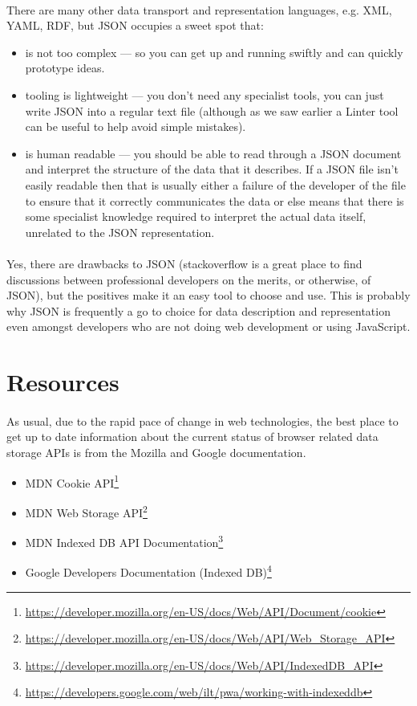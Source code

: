 \paragraph{} There are many other data transport and representation languages, e.g. XML, YAML, RDF, but JSON occupies a sweet spot that:

\begin{itemize}
\item is not too complex — so you can get up and running swiftly and can quickly prototype ideas.
\item tooling is lightweight — you don't need any specialist tools, you can just write JSON into a regular text file (although as we saw earlier a Linter tool can be useful to help avoid simple mistakes).
\item is human readable — you should be able to read through a JSON document and interpret the structure of the data that it describes. If a JSON file isn't easily readable then that is usually either a failure of the developer of the file to ensure that it correctly communicates the data or else means that there is some specialist knowledge required to interpret the actual data itself, unrelated to the JSON representation.
\end{itemize}

\paragraph{} Yes, there are drawbacks to JSON (stackoverflow is a great place to find discussions between professional developers on the merits, or otherwise, of JSON), but the positives make it an easy tool to choose and use. This is probably why JSON is frequently a go to choice for data description and representation even amongst developers who are not doing web development or using JavaScript.

\section{Resources}
\paragraph{} As usual, due to the rapid pace of change in web technologies, the best place to get up to date information about the current status of browser related data storage APIs is from the Mozilla and Google documentation.

\begin{itemize}
\item MDN Cookie API\footnote{\url{https://developer.mozilla.org/en-US/docs/Web/API/Document/cookie}}
\item MDN Web Storage API\footnote{\url{https://developer.mozilla.org/en-US/docs/Web/API/Web_Storage_API}}
\item MDN Indexed DB API Documentation\footnote{\url{https://developer.mozilla.org/en-US/docs/Web/API/IndexedDB_API}}
\item Google Developers Documentation (Indexed DB)\footnote{\url{https://developers.google.com/web/ilt/pwa/working-with-indexeddb}}
\end{itemize}

